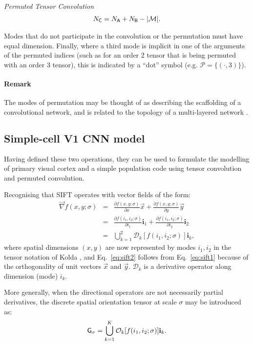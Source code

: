 \begin{definition}{\textit{Permuted Tensor Convolution}}
\begin{equation}
N_{\mathsf{C}} = N_{\mathsf{A}} + N_{\mathsf{B}} - |\mathcal{M}|.
\end{equation}

Modes that do not participate in the convolution or the permutation must have equal dimension. Finally, where a third mode is implicit in one of the arguments of the permuted indices (such as for an order 2 tensor that is being permuted with an order 3 tensor), this is indicated by a ``dot'' symbol (e.g. $\mathcal{P} = \lbrace (\cdot,3)\rbrace$).

\paragraph{Remark} The modes of permutation may be thought of as describing the scaffolding of a convolutional network, and is related to the topology of a multi-layered network \cite{chang2015deep}. 


\end{definition}


\subsection{Simple-cell V1 CNN model}


Having defined these two operations, they can be used to formulate the modelling of primary visual cortex and a simple population code using tensor convolution and permuted convolution. 

Recognising that SIFT operates with vector fields of the form:
\begin{eqnarray}
\label{eq:sift1}
\vec{\nabla} f(x,y;\sigma) &=& \frac{\partial f(x,y;\sigma)}{\partial x}\vec{x} + \frac{\partial f(x,y;\sigma)}{\partial y}\vec{y}\nonumber \\
&=& \frac{\partial f(i_1,i_2;\sigma)}{\partial i_1}\mathbf{i}_1 + \frac{\partial f(i_1,i_2;\sigma)}{\partial i_2}\mathbf{i}_2\\
\label{eq:sift2}
&=& \bigcup_{k=1}^2 \mathcal{D}_k [ f(i_1,i_2;\sigma) ] \mathbf{i}_k, 
\end{eqnarray}
where spatial dimensions $(x,y)$ are now represented by modes $i_1,i_2$ in the tensor notation of Kolda \citep{kolda2009tensor}, and Eq.~\ref{eq:sift2} follows from Eq.~\ref{eq:sift1} because of the orthogonality of unit vectors $\vec{x}$ and $\vec{y}$.  $\mathcal{D}_k$ is a derivative operator along dimension (mode) $i_k$. 

More generally, when the directional operators are not necessarily partial derivatives, the discrete spatial orientation tensor at scale $\sigma$ may be introduced as:
\begin{equation}
\mathsf{G}_{\sigma}  = \bigcup_{k=1}^K \mathcal{O}_k [ f(i_1,i_2;\sigma) ] \mathbf{i}_k.
\label{eq:IntroG}
\end{equation}

